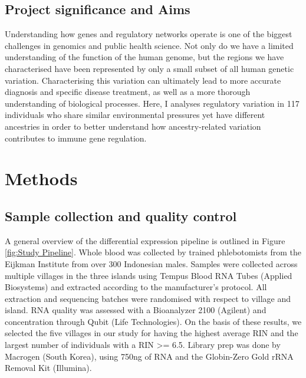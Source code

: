 \documentclass[12pt,a4paper,titlepage,twoside,openright]{book}
\begin{document}
\begin{mainmatter}
{{\section{Project significance and Aims}
Understanding how genes and regulatory networks operate is one of the biggest challenges in genomics and public health science. Not only do we have a limited understanding of the function of the human genome, but the regions we have characterised have been represented by only a small subset of all human genetic variation. Characterising this variation can ultimately lead to more accurate diagnosis and specific disease treatment, as well as a more thorough understanding of biological processes. Here, I analyses regulatory variation in 117 individuals who share similar environmental pressures yet have different ancestries in order to better understand how ancestry-related variation contributes to immune gene regulation.

\chapter{Methods}\label{}
\section{Sample collection and quality control}
A general overview of the differential expression pipeline is outlined in Figure \ref{fig:Study Pipeline}. Whole blood was collected by trained phlebotomists from the Eijkman Institute from over 300 Indonesian males. Samples were collected across multiple villages in the three islands using Tempus Blood RNA Tubes (Applied Biosystems) and extracted according to the manufacturer's protocol. All extraction and sequencing batches were randomised with respect to village and island. RNA quality was assessed with a Bioanalyzer 2100 (Agilent) and concentration through Qubit (Life Technologies). On the basis of these results, we selected the five villages in our study for having the highest average RIN and the largest number of individuals with a RIN >= 6.5. Library prep was done by Macrogen (South Korea), using 750ng of RNA and the Globin-Zero Gold rRNA Removal Kit (Illumina). 

}}
\end{mainmatter}
\end{document}
